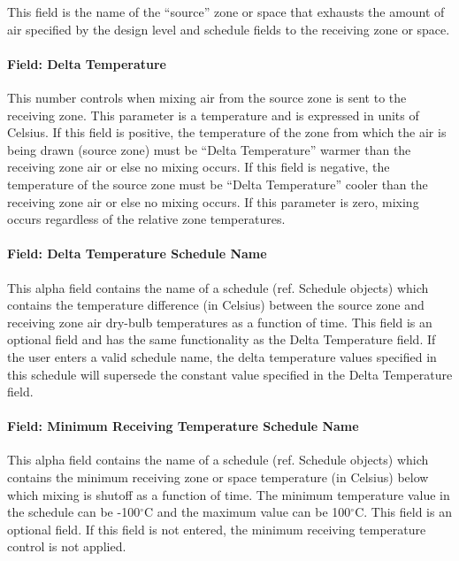 This field is the name of the ``source'' zone or space that exhausts the amount of air specified by the design level and schedule fields to the receiving zone or space.

\paragraph{Field: Delta Temperature}\label{field-delta-temperature-2}

This number controls when mixing air from the source zone is sent to the receiving zone. This parameter is a temperature and is expressed in units of Celsius. If this field is positive, the temperature of the zone from which the air is being drawn (source zone) must be ``Delta Temperature'' warmer than the receiving zone air or else no mixing occurs. If this field is negative, the temperature of the source zone must be ``Delta Temperature'' cooler than the receiving zone air or else no mixing occurs. If this parameter is zero, mixing occurs regardless of the relative zone temperatures.

\paragraph{Field: Delta Temperature Schedule Name}\label{field-delta-temperature-schedule-name-2}

This alpha field contains the name of a schedule (ref. Schedule objects) which contains the temperature difference (in Celsius) between the source zone and receiving zone air dry-bulb temperatures as a function of time. This field is an optional field and has the same functionality as the Delta Temperature field. If the user enters a valid schedule name, the delta temperature values specified in this schedule will supersede the constant value specified in the Delta Temperature field.

\paragraph{Field: Minimum Receiving Temperature Schedule Name}\label{field-minimum-zone-temperature-schedule-name}

This alpha field contains the name of a schedule (ref. Schedule objects) which contains the minimum receiving zone or space temperature (in Celsius) below which mixing is shutoff as a function of time. The minimum temperature value in the schedule can be -100$^\circ$C and the maximum value can be 100$^\circ$C. This field is an optional field. If this field is not entered, the minimum receiving temperature control is not applied.


